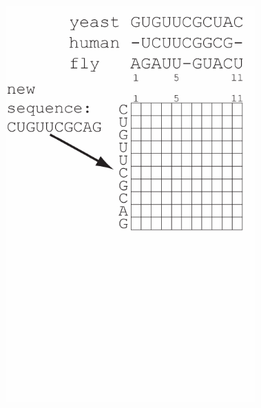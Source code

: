\documentclass[landscape]{slides}
\begin{document}
\begin{slide}
\begin{minipage}{4in}
\begin{center}
\includegraphics[height=6in]{figs/hmm_alignment2_layer1}
\end{center}
\vspace{1.5in}
\end{minipage}
\end{slide}
\end{document}
